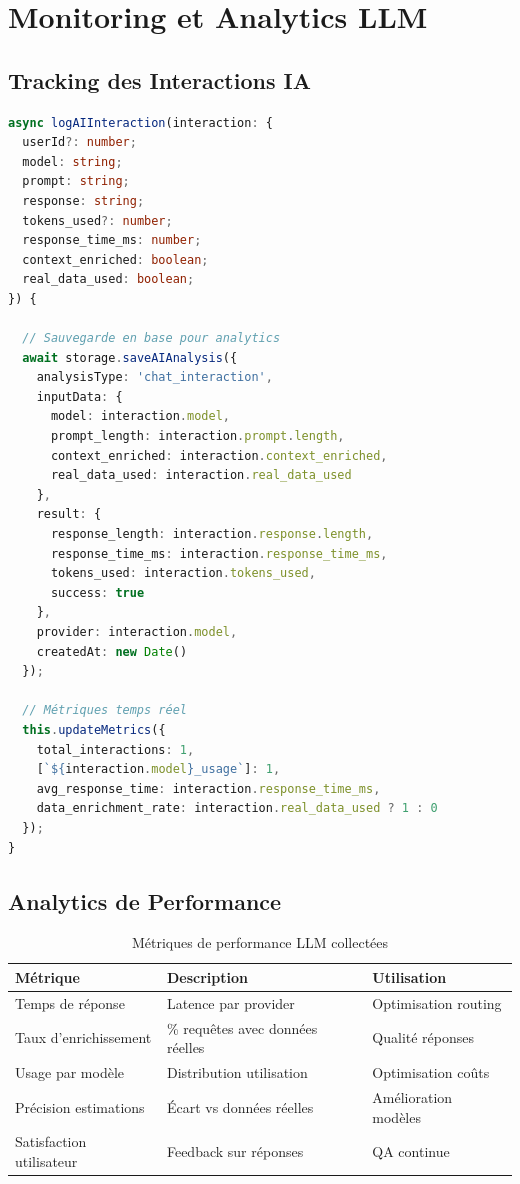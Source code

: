 \section{Monitoring et Analytics LLM}

\subsection{Tracking des Interactions IA}

\begin{lstlisting}[language=TypeScript, caption=Logging avancé des interactions IA]
async logAIInteraction(interaction: {
  userId?: number;
  model: string;
  prompt: string;
  response: string;
  tokens_used?: number;
  response_time_ms: number;
  context_enriched: boolean;
  real_data_used: boolean;
}) {
  
  // Sauvegarde en base pour analytics
  await storage.saveAIAnalysis({
    analysisType: 'chat_interaction',
    inputData: {
      model: interaction.model,
      prompt_length: interaction.prompt.length,
      context_enriched: interaction.context_enriched,
      real_data_used: interaction.real_data_used
    },
    result: {
      response_length: interaction.response.length,
      response_time_ms: interaction.response_time_ms,
      tokens_used: interaction.tokens_used,
      success: true
    },
    provider: interaction.model,
    createdAt: new Date()
  });
  
  // Métriques temps réel
  this.updateMetrics({
    total_interactions: 1,
    [`${interaction.model}_usage`]: 1,
    avg_response_time: interaction.response_time_ms,
    data_enrichment_rate: interaction.real_data_used ? 1 : 0
  });
}
\end{lstlisting}

\subsection{Analytics de Performance}

\begin{table}[H]
\centering
\caption{Métriques de performance LLM collectées}
\begin{tabular}{|l|l|l|}
\hline
\textbf{Métrique} & \textbf{Description} & \textbf{Utilisation} \\
\hline
Temps de réponse & Latence par provider & Optimisation routing \\
\hline
Taux d'enrichissement & \% requêtes avec données réelles & Qualité réponses \\
\hline
Usage par modèle & Distribution utilisation & Optimisation coûts \\
\hline
Précision estimations & Écart vs données réelles & Amélioration modèles \\
\hline
Satisfaction utilisateur & Feedback sur réponses & QA continue \\
\hline
\end{tabular}
\end{table}

